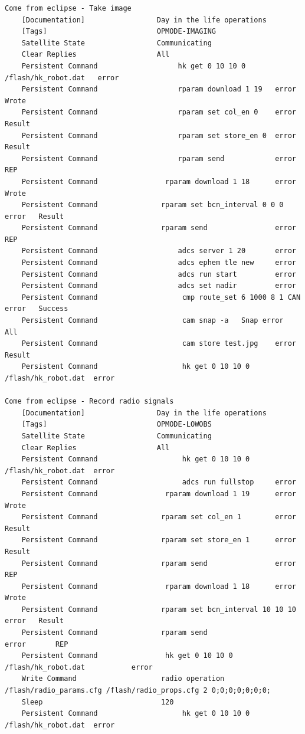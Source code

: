 \documentclass[english,12pt,a4paper,pdftex,elec,utf8]{aaltothesis}
\begin{document}
\begin{verbatim}
Come from eclipse - Take image
    [Documentation]                 Day in the life operations
    [Tags]                          OPMODE-IMAGING
    Satellite State                 Communicating
    Clear Replies                   All
    Persistent Command                   hk get 0 10 10 0 /flash/hk_robot.dat   error
    Persistent Command                   rparam download 1 19   error   Wrote
    Persistent Command                   rparam set col_en 0    error   Result
    Persistent Command                   rparam set store_en 0  error   Result
    Persistent Command                   rparam send            error   REP
    Persistent Command                rparam download 1 18      error   Wrote
    Persistent Command               rparam set bcn_interval 0 0 0      error   Result
    Persistent Command               rparam send                error       REP
    Persistent Command                   adcs server 1 20       error
    Persistent Command                   adcs ephem tle new     error
    Persistent Command                   adcs run start         error
    Persistent Command                   adcs set nadir         error
    Persistent Command                    cmp route_set 6 1000 8 1 CAN  error   Success
    Persistent Command                    cam snap -a   Snap error  All
    Persistent Command                    cam store test.jpg    error    Result
    Persistent Command                    hk get 0 10 10 0 /flash/hk_robot.dat  error

Come from eclipse - Record radio signals
    [Documentation]                 Day in the life operations
    [Tags]                          OPMODE-LOWOBS
    Satellite State                 Communicating
    Clear Replies                   All
    Persistent Command                    hk get 0 10 10 0 /flash/hk_robot.dat  error
    Persistent Command                    adcs run fullstop     error
    Persistent Command                rparam download 1 19      error   Wrote
    Persistent Command               rparam set col_en 1        error   Result
    Persistent Command               rparam set store_en 1      error   Result
    Persistent Command               rparam send                error       REP
    Persistent Command                rparam download 1 18      error       Wrote
    Persistent Command               rparam set bcn_interval 10 10 10       error   Result
    Persistent Command               rparam send                    error       REP
    Persistent Command                hk get 0 10 10 0 /flash/hk_robot.dat           error
    Write Command                    radio operation /flash/radio_params.cfg /flash/radio_props.cfg 2 0;0;0;0;0;0;0;
    Sleep                            120
    Persistent Command                    hk get 0 10 10 0 /flash/hk_robot.dat  error


\end{verbatim}
\end{document}
